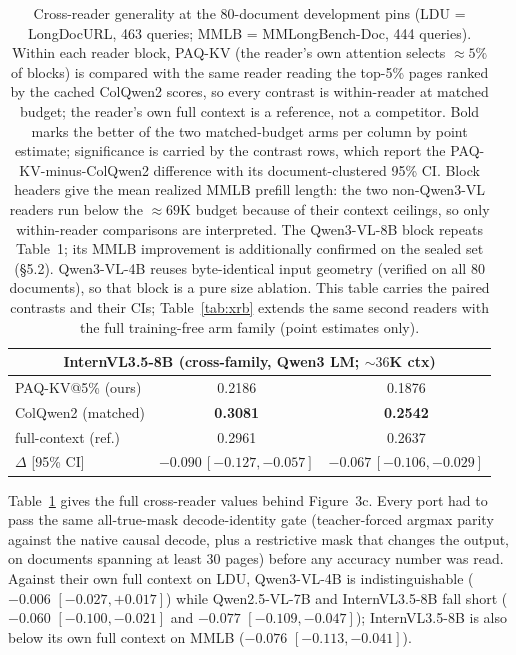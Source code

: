 \documentclass[letterpaper]{article} %
\newcommand{\paqc}{\textsc{PAQ-KV}}
\begin{document}
\begin{table}[t]
\begin{tabular}{lcc}
\midrule
\multicolumn{3}{c}{InternVL3.5-8B (cross-family, Qwen3 LM; ${\sim}36$K ctx)} \\
\midrule
\paqc{}@5\% (ours) & 0.2186 & 0.1876 \\
ColQwen2 (matched) & \textbf{0.3081} & \textbf{0.2542} \\
full-context (ref.) & 0.2961 & 0.2637 \\
$\Delta$ [95\% CI] & $-0.090\,[-0.127,-0.057]$ & $-0.067\,[-0.106,-0.029]$ \\
\bottomrule
\end{tabular}
\caption{Cross-reader generality at the 80-document development pins (LDU = LongDocURL, 463 queries; MMLB = MMLongBench-Doc, 444 queries). Within each reader block, \paqc{} (the reader's own attention selects ${\approx}5\%$ of blocks) is compared with the same reader reading the top-5\% pages ranked by the cached ColQwen2 scores, so every contrast is within-reader at matched budget; the reader's own full context is a reference, not a competitor. Bold marks the better of the two matched-budget arms per column by point estimate; significance is carried by the contrast rows, which report the \paqc{}-minus-ColQwen2 difference with its document-clustered 95\% CI. Block headers give the mean realized MMLB prefill length: the two non-Qwen3-VL readers run below the ${\approx}69$K budget because of their context ceilings, so only within-reader comparisons are interpreted. The Qwen3-VL-8B block repeats Table~1; its MMLB improvement is additionally confirmed on the sealed set (\S5.2). Qwen3-VL-4B reuses byte-identical input geometry (verified on all 80 documents), so that block is a pure size ablation. This table carries the paired contrasts and their CIs; Table~\ref{tab:xrb} extends the same second readers with the full training-free arm family (point estimates only).}
\label{tab:crossreader}
\end{table}

Table~\ref{tab:crossreader} gives the full cross-reader values behind
Figure~3c. Every port had to pass the same all-true-mask
decode-identity gate (teacher-forced argmax parity against the native causal
decode, plus a restrictive mask that changes the output, on documents
spanning at least 30 pages) before any accuracy number was read. Against
their own full context on LDU, Qwen3-VL-4B is indistinguishable
($-0.006$ $[-0.027,+0.017]$) while Qwen2.5-VL-7B and InternVL3.5-8B fall
short ($-0.060$ $[-0.100,-0.021]$ and $-0.077$ $[-0.109,-0.047]$);
InternVL3.5-8B is also below its own full context on MMLB
($-0.076$ $[-0.113,-0.041]$).
\end{document}
